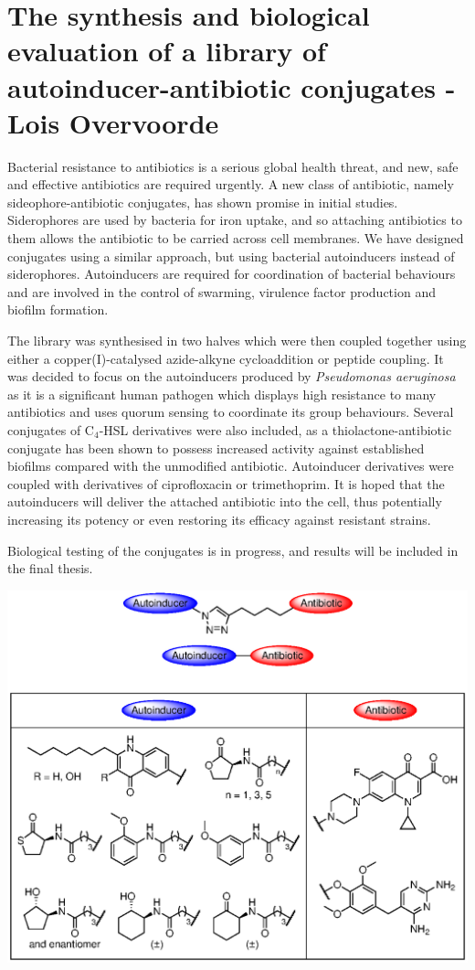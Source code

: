 \documentclass[10pt,a4paper]{article}
\begin{document}
\section*{The synthesis and biological evaluation of a library of autoinducer-antibiotic conjugates - Lois Overvoorde}

Bacterial resistance to antibiotics is a serious global health threat, and new, safe and effective antibiotics are required urgently. A new class of antibiotic, namely sideophore-antibiotic conjugates, has shown promise in initial studies. Siderophores are used by bacteria for iron uptake, and so attaching antibiotics to them allows the antibiotic to be carried across cell membranes. We have designed conjugates using a similar approach, but using bacterial autoinducers instead of siderophores. Autoinducers are required for coordination of bacterial behaviours and are involved in the control of swarming, virulence factor production and biofilm formation. 

The library was synthesised in two halves which were then coupled together using either a copper(I)-catalysed azide-alkyne cycloaddition or peptide coupling. It was decided to focus on the autoinducers produced by \textit{Pseudomonas aeruginosa} as it is a significant human pathogen which displays high resistance to many antibiotics and uses quorum sensing to coordinate its group behaviours.
Several conjugates of  C$_4$-HSL derivatives were also included, as a thiolactone-antibiotic conjugate has been shown to possess increased activity against established biofilms compared with the unmodified antibiotic.
Autoinducer derivatives were coupled with derivatives of ciprofloxacin or trimethoprim. It is hoped that the autoinducers will deliver the attached antibiotic into the cell, thus potentially increasing its potency or even restoring its efficacy against resistant strains.

Biological testing of the conjugates is in progress, and results will be included in the final thesis.
	
\begin{scheme}[H]
	\begin{center}
		\includegraphics[width=\linewidth]{Summary_1}
	\end{center}
\end{scheme}
\end{document}
